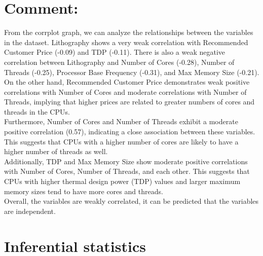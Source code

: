 \documentclass[a4paper]{article}
\begin{document}
	\section*{Comment:}
	From the corrplot graph, we can analyze the relationships between the variables in the dataset. Lithography shows a very weak correlation with Recommended Customer Price (-0.09) and TDP (-0.11). There is also a weak negative correlation between Lithography and Number of Cores (-0.28), Number of Threads (-0.25), Processor Base Frequency (-0.31), and Max Memory Size (-0.21).\\
	On the other hand, Recommended Customer Price demonstrates weak positive correlations with Number of Cores and moderate correlations with Number of Threads, implying that higher prices are related to greater numbers of cores and threads in the CPUs.\\
	Furthermore, Number of Cores and Number of Threads exhibit a moderate positive correlation (0.57), indicating a close association between these variables. This suggests that CPUs with a higher number of cores are likely to have a higher number of threads as well.\\
	Additionally, TDP and Max Memory Size show moderate positive correlations with Number of Cores, Number of Threads, and each other. This suggests that CPUs with higher thermal design power (TDP) values and larger maximum memory sizes tend to have more cores and threads.\\
	Overall, the variables are weakly correlated, it can be predicted that the variables are independent.
	\section{Inferential statistics}
\end{document}
